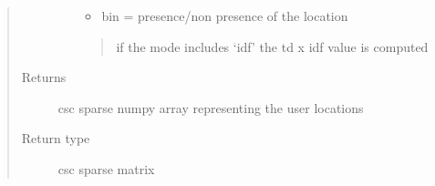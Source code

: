 \documentclass[letterpaper,10pt,english]{sphinxmanual}
\begin{document}
\begin{fulllineitems}
\begin{fulllineitems}
\begin{quote}
\begin{description}
\begin{itemize}
\begin{itemize}
\item {} 
bin = presence/non presence of the location

\end{itemize}
\begin{quote}

if the mode includes `idf' the td x idf value is computed
\end{quote}


\end{itemize}

\item[{Returns}] \leavevmode
csc sparse numpy array representing the user locations

\item[{Return type}] \leavevmode
csc sparse matrix

\end{description}\end{quote}

\end{fulllineitems}


\end{fulllineitems}

\end{document}
